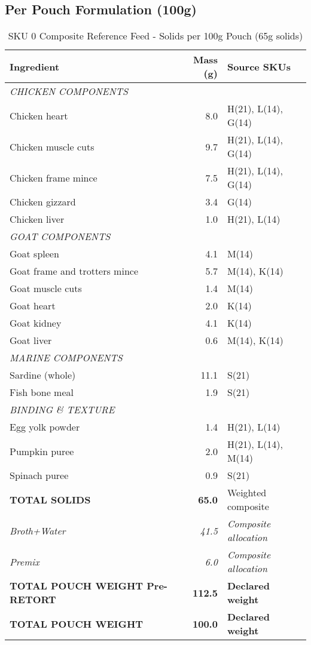 \subsection*{Per Pouch Formulation (100g)}
\begin{table}[h]
\centering
\caption{SKU 0 Composite Reference Feed - Solids per 100g Pouch (65g solids)}
\begin{tabular}{@{}lrp{6cm}@{}}
\toprule
\textbf{Ingredient} & \textbf{Mass (g)} & \textbf{Source SKUs} \\
\midrule
\multicolumn{3}{l}{\textit{CHICKEN COMPONENTS}} \\
Chicken heart & 8.0 & H(21), L(14), G(14) \\
Chicken muscle cuts & 9.7 & H(21), L(14), G(14) \\
Chicken frame mince & 7.5 & H(21), L(14), G(14) \\
Chicken gizzard & 3.4 & G(14) \\
Chicken liver & 1.0 & H(21), L(14) \\
\midrule
\multicolumn{3}{l}{\textit{GOAT COMPONENTS}} \\
Goat spleen & 4.1 & M(14) \\
Goat frame and trotters mince & 5.7 & M(14), K(14) \\
Goat muscle cuts & 1.4 & M(14) \\
Goat heart & 2.0 & K(14) \\
Goat kidney & 4.1 & K(14) \\
Goat liver & 0.6 & M(14), K(14) \\
\midrule
\multicolumn{3}{l}{\textit{MARINE COMPONENTS}} \\
Sardine (whole) & 11.1 & S(21) \\
Fish bone meal & 1.9 & S(21) \\
\midrule
\multicolumn{3}{l}{\textit{BINDING \& TEXTURE}} \\
Egg yolk powder & 1.4 & H(21), L(14) \\
Pumpkin puree & 2.0 & H(21), L(14), M(14) \\
Spinach puree & 0.9 & S(21) \\
\midrule
\textbf{TOTAL SOLIDS} & \textbf{65.0} & Weighted composite \\
\textit{Broth+Water} & \textit{41.5} & \textit{Composite allocation} \\
\textit{Premix} & \textit{6.0} & \textit{Composite allocation} \\
\midrule
\textbf{TOTAL POUCH WEIGHT Pre-RETORT} & \textbf{112.5} & \textbf{Declared weight} \\
\textbf{TOTAL POUCH WEIGHT} & \textbf{100.0} & \textbf{Declared weight} \\
\bottomrule
\end{tabular}
\end{table}

